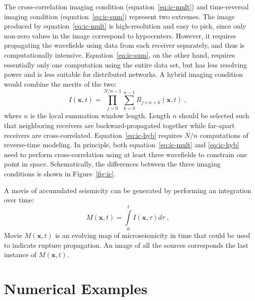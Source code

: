 The cross-correlation imaging condition (equation~\ref{eq:ic-mult}) and time-reversal imaging condition (equation~\ref{eq:ic-sum}) represent two extremes. The image produced by equation~\ref{eq:ic-mult} is high-resolution and easy to pick, since only non-zero values in the image correspond to hypocenters. However, it requires propagating the wavefields using data from each receiver separately, and thus is computationally intensive. Equation~\ref{eq:ic-sum}, on the other hand, requires essentially only one computation using the entire data set, but has less resolving power and is less suitable for distributed networks. A hybrid imaging condition would combine the merits of the two:
\begin{equation}
\label{eq:ic-hyb}
I(\mathbf{x},t) = \prod\limits_{j=0}^{N/n-1} \sum\limits_{k=0}^{n-1} R_{j \times n+k}(\mathbf{x},t) \; ,
\end{equation}
where $n$ is the local summation window length. Length $n$ should be selected such that neighboring receivers are backward-propagated together while far-apart receivers are cross-correlated. Equation~\ref{eq:ic-hyb} requires $N/n$ computations of reverse-time modeling. In principle, both equation~\ref{eq:ic-mult} and \ref{eq:ic-hyb} need to perform cross-correlation using at least three wavefields to constrain one point in space. Schematically, the differences between the three imaging conditions is shown in Figure~\ref{fig:ic}.


A movie of accumulated seismicity can be generated by performing an integration over time:
\begin{equation}
\label{eq:ic-int}
M(\mathbf{x},t) = \int \limits_0^t I(\mathbf{x},\tau) d\tau \; ,
\end{equation}
Movie $M(\mathbf{x},t)$ is an evolving map of microseismicity in time that could be used to indicate rupture propagation. An image of all the sources corresponds the last instance of $M(\mathbf{x},t)$.

\section{Numerical Examples}

